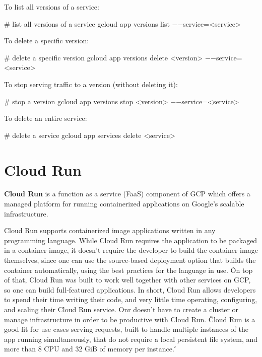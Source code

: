 To list all versions of a service:
\begin{bash}
# list all versions of a service
gcloud app versions list $-$$-$service=<service>
\end{bash}

To delete a specific version:
\begin{bash}
# delete a specific version
gcloud app versions delete <version> $-$$-$service=<service>
\end{bash}

To stop serving traffic to a version (without deleting it):
\begin{bash}
# stop a version
gcloud app versions stop <version> $-$$-$service=<service>
\end{bash}

To delete an entire service:
\begin{bash}
# delete a service
gcloud app services delete <service>
\end{bash}

\section{Cloud Run}

\textbf{Cloud Run} is a function as a service (FaaS) component of GCP which offers a managed platform for running
containerized applications on Google's scalable infrastructure.
\ed

Cloud Run supports containerized image applications written in any programming language. While Cloud Run requires the
application to be packaged in a container image, it doesn't require the developer to build the container image
themselves, since one can use the source-based deployment option that builds the container automatically, using the
best practices for the language in use. \v

On top of that, Cloud Run was built to work well together with other services on GCP, so one can build full-featured
applications. In short, Cloud Run allows developers to spend their time writing their code, and very little time
operating, configuring, and scaling their Cloud Run service. Onr doesn't have to create a cluster or manage
infrastructure in order to be productive with Cloud Run\@. \v

Cloud Run is a good fit for use cases serving requests, built to handle multiple instances of the app running
simultaneously, that do not require a local persistent file system, and more than 8 CPU and 32 GiB of memory per
instance. \v

